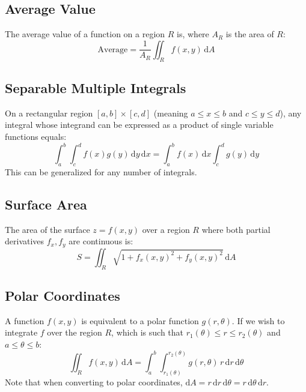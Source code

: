 \documentclass{article}
\begin{document}
\subsection{Average Value}

The average value of a function on a region $R$ is, where $A_R$ is the area of $R$:
\begin{equation*}
	\text{Average}=\frac{1}{A_R}\iint_R f(x,y) \,\mathrm{d}A
\end{equation*}

\subsection{Separable Multiple Integrals}

On a rectangular region $[a,b]\times[c,d]$ (meaning $a\leq x\leq b$ and $c\leq y\leq d$), any integral whose integrand can be expressed as a product of single variable functions equals:
\begin{equation*}
	\int_{a}^{b}\int_{c}^{d}f(x)g(y)\,\mathrm{d}y\,\mathrm{d}x
	=\int_{a}^{b}f(x)\,\mathrm{d}x \int_{c}^{d}g(y)\,\mathrm{d}y
\end{equation*}
This can be generalized for any number of integrals.

\subsection{Surface Area}

The area of the surface $z=f(x,y)$ over a region $R$ where both partial derivatives $f_x,f_y$ are continuous is:
\begin{equation*}
    S=\iint_R \sqrt{1+f_x(x,y)^2+f_y(x,y)^2}\,\mathrm{d}A
\end{equation*}

\subsection{Polar Coordinates}

A function $f(x,y)$ is equivalent to a polar function $g(r,\theta)$. If we wish to integrate $f$ over the region $R$, which is such that $r_1(\theta)\leq r\leq r_2(\theta)$ and $a\leq \theta\leq b$:
\begin{equation*}
    \iint_R f(x,y) \,\mathrm{d}A
	=\int_{a}^{b}\int_{r_1(\theta)}^{r_2(\theta)}g(r,\theta)\, r\,\mathrm{d}r\,\mathrm{d}\theta
\end{equation*}
Note that when converting to polar coordinates, $\mathrm{d}A=r \,\mathrm{d}r \,\mathrm{d}\theta=r \,\mathrm{d}\theta \,\mathrm{d}r$.
\end{document}
